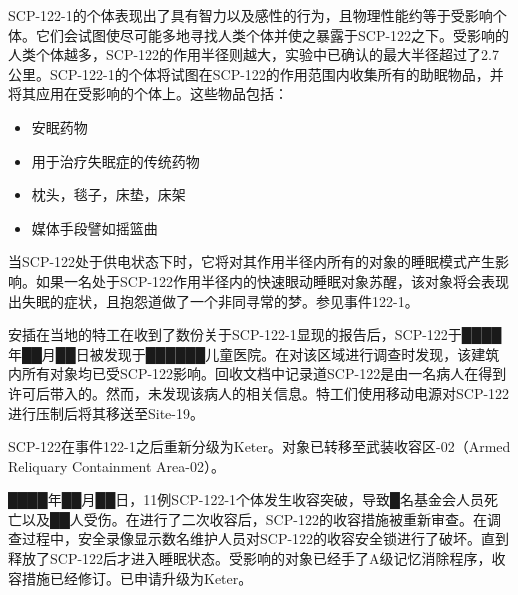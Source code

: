 SCP-122-1的个体表现出了具有智力以及感性的行为，且物理性能约等于受影响个体。它们会试图使尽可能多地寻找人类个体并使之暴露于SCP-122之下。受影响的人类个体越多，SCP-122的作用半径则越大，实验中已确认的最大半径超过了2.7公里。SCP-122-1的个体将试图在SCP-122的作用范围内收集所有的助眠物品，并将其应用在受影响的个体上。这些物品包括：

\begin{itemize}
\item 安眠药物
\item 用于治疗失眠症的传统药物
\item 枕头，毯子，床垫，床架
\item 媒体手段譬如摇篮曲
\end{itemize}

当SCP-122处于供电状态下时，它将对其作用半径内所有的对象的睡眠模式产生影响。如果一名处于SCP-122作用半径内的快速眼动睡眠对象苏醒，该对象将会表现出失眠的症状，且抱怨道做了一个非同寻常的梦。参见事件122-1。

安插在当地的特工在收到了数份关于SCP-122-1显现的报告后，SCP-122于████年██月██日被发现于██████儿童医院。在对该区域进行调查时发现，该建筑内所有对象均已受SCP-122影响。回收文档中记录道SCP-122是由一名病人在得到许可后带入的。然而，未发现该病人的相关信息。特工们使用移动电源对SCP-122进行压制后将其移送至Site-19。

SCP-122在事件122-1之后重新分级为Keter。对象已转移至武装收容区-02（Armed Reliquary Containment Area-02）。

████年██月██日，11例SCP-122-1个体发生收容突破，导致█名基金会人员死亡以及██人受伤。在进行了二次收容后，SCP-122的收容措施被重新审查。在调查过程中，安全录像显示数名维护人员对SCP-122的收容安全锁进行了破坏。直到释放了SCP-122后才进入睡眠状态。受影响的对象已经手了A级记忆消除程序，收容措施已经修订。已申请升级为Keter。
